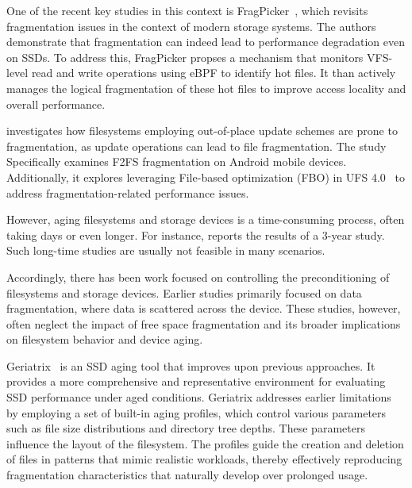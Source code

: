 One of the recent key studies in this context is FragPicker~\cite{fragpicker:sosp21}, which revisits fragmentation issues in the context of modern storage systems.
The authors demonstrate that fragmentation can indeed lead to performance degradation even on SSDs.
To address this, FragPicker propses a mechanism that monitors VFS-level read and write operations using eBPF to identify hot files.
It than actively manages the logical fragmentation of these hot files to improve access locality and overall performance.

\cite{f2fs-mobile:nvmsa24} investigates how filesystems employing out-of-place update schemes are prone to fragmentation, as update operations can lead to file fragmentation.
The study Specifically examines F2FS fragmentation on Android mobile devices.
Additionally, it explores leveraging File-based optimization (FBO) in UFS 4.0~\cite{ufs4.0} to address fragmentation-related performance issues.


However, aging filesystems and storage devices is a time-consuming process, often taking days or even longer.
For instance, \cite{fs-aging:sigmetrics97} reports the results of a 3-year study.
Such long-time studies are usually not feasible in many scenarios.

Accordingly, there has been work focused on controlling the preconditioning of filesystems and storage devices.
Earlier studies primarily focused on data fragmentation, where data is scattered across the device.
These studies, however, often neglect the impact of free space fragmentation and its broader implications on filesystem behavior and device aging.

Geriatrix~\cite{geriatrix:atc18} is an SSD aging tool that improves upon previous approaches.
It provides a more comprehensive and representative environment for evaluating SSD performance under aged conditions.
Geriatrix addresses earlier limitations by employing a set of built-in aging profiles, which control various parameters such as file size distributions and directory tree depths.
These parameters influence the layout of the filesystem.
The profiles guide the creation and deletion of files in patterns that mimic realistic workloads, thereby effectively reproducing fragmentation characteristics that naturally develop over prolonged usage.
